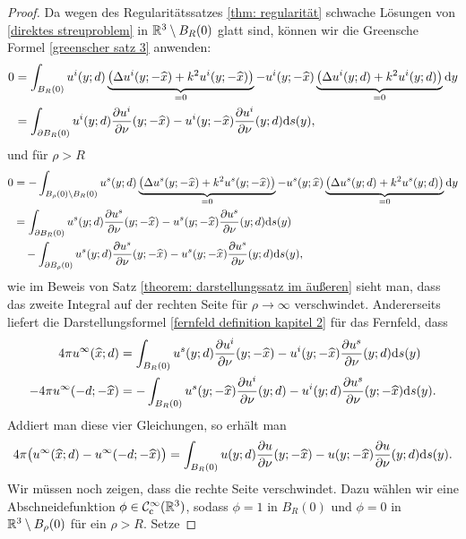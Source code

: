\begin{proof}
	Da wegen des Regularitätssatzes \ref{thm: regularität} schwache Lösungen von \eqref{direktes streuproblem} in \(\mathbb{R}^3\setminus B_R(0)\) glatt sind, können wir die Greensche Formel \eqref{greenscher satz 3} anwenden:
	\begin{align*}
		0&=\int_{B_R(0)}u^ i(y;d) \underbrace{\big(\Delta u^i(y;-\widehat{x})+k^2u^i(y;-\widehat{x})\big)}_{=0} - u^i(y;-\widehat{x}) \underbrace{\big(\Delta u^i(y;d)+k^2u^i(y;d)\big)}_{=0}\mathrm{d}y\\
		&=\int_{\partial B_R(0)}u^i(y;d)\frac{\partial u^i}{\partial\nu}(y;-\widehat{x})-u^i(y;-\widehat{x})\frac{\partial u^i}{\partial\nu}(y;d)\mathrm{d}s(y),
	\end{align*}
	und für \(\rho>R\)
	\begin{align*}
		0&=-\int_{B_\rho(0)\setminus B_R(0)} u^s(y;d)\underbrace{\big(\Delta u^s(y;-\widehat{x})+k^2u^s(y;-\widehat{x})\big)}_{=0} - u^s(y;\widehat{x})\underbrace{\big(\Delta u^s(y;d)+k^2u^s(y;d)\big)}_{=0} \mathrm{d}y\\
		&=\int_{\partial B_R(0)} u^s(y;d)\frac{\partial u^s}{\partial\nu}(y;-\widehat{x})-u^s(y;-\widehat{x})\frac{\partial u^s}{\partial\nu}(y;d)\mathrm{d}s(y)\\
		&\quad-\int_{\partial B_\rho(0)} u^s(y;d)\frac{\partial u^s}{\partial\nu}(y;-\widehat{x})-u^s(y;-\widehat{x})\frac{\partial u^s}{\partial\nu}(y;d)\mathrm{d}s(y),
	\end{align*}
	wie im Beweis von Satz \ref{theorem: darstellungssatz im äußeren} sieht man, dass das zweite Integral auf der rechten Seite für \(\rho\to\infty\) verschwindet. Andererseits liefert die Darstellungsformel \eqref{fernfeld definition kapitel 2} für das Fernfeld, dass
	\begin{align*}
		4\pi u^\infty(\widehat{x};d)&=\int_{B_R(0)} u^s(y;d)\frac{\partial u^i}{\partial\nu}(y;-\widehat{x}) - u^i(y;-\widehat{x})\frac{\partial u^s}{\partial\nu}(y;d) \mathrm{d}s(y)\\
		-4\pi u^\infty(-d;-\widehat{x})&=-\int_{B_R(0)} u^s(y;-\widehat{x})\frac{\partial u^i}{\partial\nu}(y;d) - u^i(y;d)\frac{\partial u^s}{\partial\nu}(y;-\widehat{x}) \mathrm{d}s(y).
	\end{align*}
	Addiert man diese vier Gleichungen, so erhält man
	\begin{equation*}
		4\pi\big(u^\infty(\widehat{x};d)-u^\infty(-d;-\widehat{x})\big)= \int_{B_R(0)}u(y;d)\frac{\partial u}{\partial\nu}(y;-\widehat{x}) - u(y;-\widehat{x})\frac{\partial u}{\partial\nu}(y;d) \mathrm{d}s(y).
	\end{equation*}
	Wir müssen noch zeigen, dass die rechte Seite verschwindet. Dazu wählen wir eine Abschneidefunktion \(\phi\in\mathcal{C}_{\mathrm{c}}^\infty(\mathbb{R}^3)\), sodass \(\phi=1\) in \(B_R(0)\) und \(\phi=0\) in \(\mathbb{R}^3\setminus B_\rho(0)\) für ein \(\rho>R\). Setze

\end{proof}
